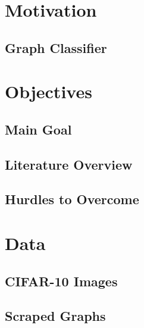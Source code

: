 \documentclass[12pt]{article}
\begin{document}
    \newpage \section{Motivation} 
    
        \subsection{Graph Classifier}
            
            

    \newpage \section{Objectives}

        \subsection{Main Goal}

           
        
        \subsection{Literature Overview}
        

        \subsection{Hurdles to Overcome}
        
    
        
    \newpage \section{Data}
            
        \subsection{CIFAR-10 Images}
    
           
            
        \subsection{Scraped Graphs}
    

            
          
\end{document}
